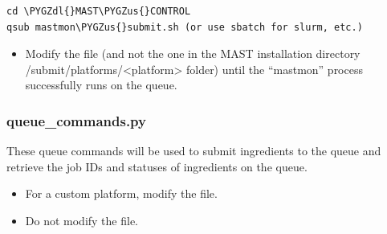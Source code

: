 \documentclass[letterpaper,10pt,english]{sphinxmanual}
\def\PYGZus{\char`\_}
\def\PYGZdl{\char`\$}
\begin{document}
\begin{Verbatim}[commandchars=\\\{\}]
cd \PYGZdl{}MAST\PYGZus{}CONTROL
qsub mastmon\PYGZus{}submit.sh (or use sbatch for slurm, etc.)
\end{Verbatim}
\begin{itemize}
\item {} 
Modify the  file (and not the one in the MAST installation directory /submit/platforms/\textless{}platform\textgreater{} folder) until the ``mastmon'' process successfully runs on the queue.

\end{itemize}


\subsubsection{queue\_commands.py}
\label{1_0_installation:queue-commands-py}
These queue commands will be used to submit ingredients to the queue and retrieve the job IDs and statuses of ingredients on the queue.
\begin{itemize}
\item {} 
For a custom platform, modify the  file.

\item {} 
Do not modify the  file.

\end{itemize}
\end{document}
